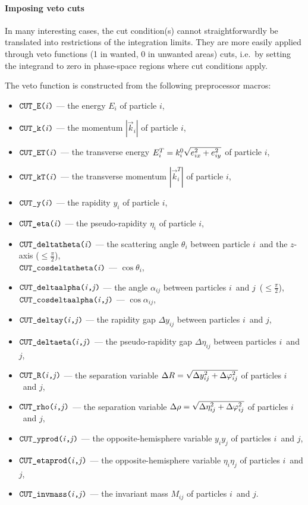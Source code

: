 \documentclass[twoside,11pt]{article}
\def\Var#1{\ensuremath{\mathit{#1}}}
\def\Vi{\Var{i}}
\def\Vj{\Var{j}}
\def\Code#1{\ensuremath{\texttt{#1}}}
\def\ie{i.e.\ }
\def\uscore{\symbol{95}}
\begin{document}
\paragraph{Imposing veto cuts}

In many interesting cases, the cut condition(s) cannot straightforwardly 
be translated into restrictions of the integration limits.  They are 
more easily applied through veto functions (1 in wanted, 0 in unwanted 
areas) cuts, \ie by setting the integrand to zero in phase-space 
regions where cut conditions apply.

The veto function is constructed from the following preprocessor macros:
\begin{itemize}
\item	\Code{CUT\uscore E(\Vi)}
	--- the energy $E_i$ of particle \Vi,
\item	\Code{CUT\uscore k(\Vi)}
	--- the momentum $|\vec k_i|$ of particle \Vi,
\item	\Code{CUT\uscore ET(\Vi)}
	--- the transverse energy $E_i^T = k_i^0 \sqrt{\smash[b]{e_{ix}^2 +
	    e_{iy}^2}}$ of particle \Vi,
\item	\Code{CUT\uscore kT(\Vi)}
	--- the transverse momentum $|\vec k_i^T|$ of particle \Vi,
\item	\Code{CUT\uscore y(\Vi)}
	--- the rapidity $y_i$ of particle \Vi,
\item	\Code{CUT\uscore eta(\Vi)}
	--- the pseudo-rapidity $\eta_i$ of particle \Vi,
\item	\Code{CUT\uscore deltatheta(\Vi)}
	--- the scattering angle $\theta_i$ between particle \Vi\ and
	    the $z$-axis ($\leqslant\tfrac\pi 2$), \\
	\Code{CUT\uscore cosdeltatheta(\Vi)}
	--- $\cos\theta_i$,
\item	\Code{CUT\uscore deltaalpha(\Vi,\Vj)}
	--- the angle $\alpha_{ij}$ between particles \Vi\ and \Vj\
	    ($\leqslant\tfrac\pi 2$), \\
	\Code{CUT\uscore cosdeltaalpha(\Vi,\Vj)}
	--- $\cos\alpha_{ij}$,
\item	\Code{CUT\uscore deltay(\Vi,\Vj)}
	--- the rapidity gap $\Delta y_{ij}$
	    between particles \Vi\ and \Vj,
\item	\Code{CUT\uscore deltaeta(\Vi,\Vj)}
	--- the pseudo-rapidity gap $\Delta\eta_{ij}$
	    between particles \Vi\ and \Vj,
\item	\Code{CUT\uscore R(\Vi,\Vj)}
	--- the separation variable
	    $\Delta R = \sqrt{\smash[b]{\Delta y_{ij}^2 + \Delta\varphi_{ij}^2}}$
	    of particles \Vi\ and \Vj,
\item	\Code{CUT\uscore rho(\Vi,\Vj)}
	--- the separation variable
	    $\Delta\rho = \sqrt{\smash[b]{\Delta\eta_{ij}^2 + \Delta\varphi_{ij}^2}}$
	    of particles \Vi\ and \Vj,
\item	\Code{CUT\uscore yprod(\Vi,\Vj)}
	--- the opposite-hemisphere variable $y_i y_j$ of
	    particles \Vi\ and \Vj,
\item	\Code{CUT\uscore etaprod(\Vi,\Vj)}
	--- the opposite-hemisphere variable $\eta_i \eta_j$ of
	    particles \Vi\ and \Vj,
\item	\Code{CUT\uscore invmass(\Vi,\Vj)}
	--- the invariant mass $M_{ij}$ of particles \Vi\ and \Vj.
\end{itemize}
\end{document}
